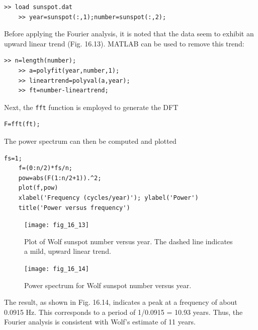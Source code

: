 \documentclass[../main.tex]{subfiles}
\begin{document}
\begin{lstlisting}[numbers=none]
	>> load sunspot.dat
	>> year=sunspot(:,1);number=sunspot(:,2);
\end{lstlisting}

\noindent Before applying the Fourier analysis, it is noted that the data seem to exhibit an upward linear trend (Fig. 16.13). MATLAB can be used to remove this trend:

\begin{lstlisting}[numbers=none]
	>> n=length(number);
	>> a=polyfit(year,number,1);
	>> lineartrend=polyval(a,year);
	>> ft=number-lineartrend;
\end{lstlisting}

\noindent Next, the \texttt{fft} function is employed to generate the DFT

\begin{lstlisting}[numbers=none]
	F=fft(ft);
\end{lstlisting}

\noindent The power spectrum can then be computed and plotted

\begin{lstlisting}[numbers=none]
	fs=1;
	f=(0:n/2)*fs/n;
	pow=abs(F(1:n/2+1)).^2;
	plot(f,pow)
	xlabel('Frequency (cycles/year)'); ylabel('Power')
	title('Power versus frequency')
\end{lstlisting}

\begin{figure}[H] 
	\centering
	\texttt{[image: fig\_16\_13]}
	\caption{\textsf{Plot of Wolf sunspot number versus year. The dashed line indicates a mild, upward linear trend.}}
	\label{fig:fig_16_13}
\end{figure}

\begin{figure}[H] 
	\centering
	\texttt{[image: fig\_16\_14]}
	\caption{\textsf{Power spectrum for Wolf sunspot number versus year.}}
	\label{fig:fig_16_14}
\end{figure}

\noindent The result, as shown in Fig. 16.14, indicates a peak at a frequency of about 0.0915 Hz. This
corresponds to a period of 1/0.0915 = 10.93 years. Thus, the Fourier analysis is consistent
with Wolf's estimate of 11 years.
\end{document}
